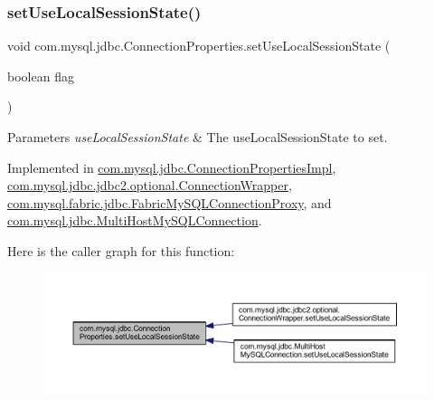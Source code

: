 \subsubsection{\texorpdfstring{set\+Use\+Local\+Session\+State()}{setUseLocalSessionState()}}
{\footnotesize\ttfamily void com.\+mysql.\+jdbc.\+Connection\+Properties.\+set\+Use\+Local\+Session\+State (\begin{DoxyParamCaption}\item[{boolean}]{flag }\end{DoxyParamCaption})}


\begin{DoxyParams}{Parameters}
{\em use\+Local\+Session\+State} & The use\+Local\+Session\+State to set. \\
\hline
\end{DoxyParams}


Implemented in \mbox{\hyperlink{classcom_1_1mysql_1_1jdbc_1_1_connection_properties_impl_a11a8cea3e36318544b06375913819d43}{com.\+mysql.\+jdbc.\+Connection\+Properties\+Impl}}, \mbox{\hyperlink{classcom_1_1mysql_1_1jdbc_1_1jdbc2_1_1optional_1_1_connection_wrapper_aad66241cb376c51b566660d1027e6b14}{com.\+mysql.\+jdbc.\+jdbc2.\+optional.\+Connection\+Wrapper}}, \mbox{\hyperlink{classcom_1_1mysql_1_1fabric_1_1jdbc_1_1_fabric_my_s_q_l_connection_proxy_afbdf422535055864190c0e35cd78d0a1}{com.\+mysql.\+fabric.\+jdbc.\+Fabric\+My\+S\+Q\+L\+Connection\+Proxy}}, and \mbox{\hyperlink{classcom_1_1mysql_1_1jdbc_1_1_multi_host_my_s_q_l_connection_a9c5be4608718622501934b5054995bf7}{com.\+mysql.\+jdbc.\+Multi\+Host\+My\+S\+Q\+L\+Connection}}.

Here is the caller graph for this function\+:\nopagebreak
\begin{figure}[H]
\begin{center}
\leavevmode
\includegraphics[width=350pt]{interfacecom_1_1mysql_1_1jdbc_1_1_connection_properties_a27a764e918cf2d90a6bbedec87ce6820_icgraph}
\end{center}
\end{figure}
\mbox{\label{interfacecom_1_1mysql_1_1jdbc_1_1_connection_properties_a0ae502be4bb0e0dca960587d7883a663}} 
